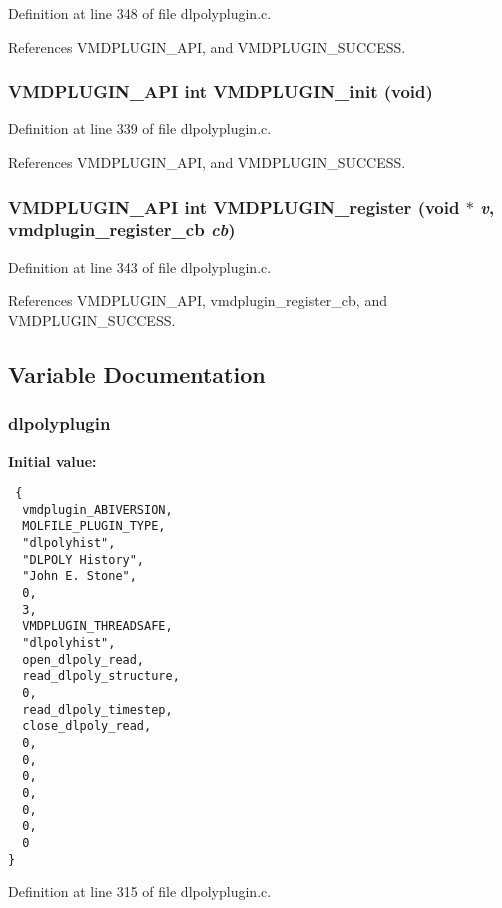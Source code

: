 Definition at line 348 of file dlpolyplugin.c.

References VMDPLUGIN\_\-API, and VMDPLUGIN\_\-SUCCESS.
\subsubsection{\setlength{\rightskip}{0pt plus 5cm}VMDPLUGIN\_\-API int VMDPLUGIN\_\-init (void)}\label{dlpolyplugin_8c_a6}




Definition at line 339 of file dlpolyplugin.c.

References VMDPLUGIN\_\-API, and VMDPLUGIN\_\-SUCCESS.
\subsubsection{\setlength{\rightskip}{0pt plus 5cm}VMDPLUGIN\_\-API int VMDPLUGIN\_\-register (void $\ast$ {\em v}, {\bf vmdplugin\_\-register\_\-cb} {\em cb})}\label{dlpolyplugin_8c_a7}




Definition at line 343 of file dlpolyplugin.c.

References VMDPLUGIN\_\-API, vmdplugin\_\-register\_\-cb, and VMDPLUGIN\_\-SUCCESS.

\subsection{Variable Documentation}
\subsubsection{ dlpolyplugin\hspace{0.3cm}{\tt  [static]}}\label{dlpolyplugin_8c_a1}


{\bf Initial value:}

\footnotesize\begin{verbatim} {
  vmdplugin_ABIVERSION,
  MOLFILE_PLUGIN_TYPE,                         
  "dlpolyhist",                                
  "DLPOLY History",                            
  "John E. Stone",                             
  0,                                           
  3,                                           
  VMDPLUGIN_THREADSAFE,                        
  "dlpolyhist",
  open_dlpoly_read,
  read_dlpoly_structure,
  0,
  read_dlpoly_timestep,
  close_dlpoly_read,
  0,                            
  0,
  0,
  0,
  0,                            
  0,                            
  0                             
}\end{verbatim}\normalsize 


Definition at line 315 of file dlpolyplugin.c.